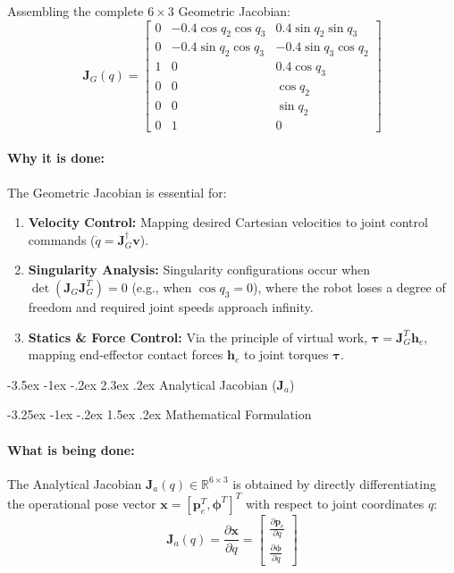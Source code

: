 \documentclass[11pt, a4paper]{article}
\makeatletter
\renewcommand{\section}{\@startsection{section}{1}{\z@}%
    {-3.5ex \@plus -1ex \@minus -.2ex}%
    {2.3ex \@plus .2ex}%
    {\normalfont\Large\bfseries\color{brandblue}}}
\renewcommand{\subsection}{\@startsection{subsection}{2}{\z@}%
    {-3.25ex \@plus -1ex \@minus -.2ex}%
    {1.5ex \@plus .2ex}%
    {\normalfont\large\bfseries\color{brandaccent}}}
\makeatother
\begin{document}
Assembling the complete $6 \times 3$ Geometric Jacobian:
\begin{equation}
\mathbf{J}_G(q) = \begin{bmatrix}
0 & -0.4 \cos q_2 \cos q_3 & 0.4 \sin q_2 \sin q_3 \\
0 & -0.4 \sin q_2 \cos q_3 & -0.4 \sin q_3 \cos q_2 \\
1 & 0 & 0.4 \cos q_3 \\
0 & 0 & \cos q_2 \\
0 & 0 & \sin q_2 \\
0 & 1 & 0
\end{bmatrix}
\end{equation}

\paragraph{Why it is done:}
The Geometric Jacobian is essential for:
\begin{enumerate}[leftmargin=1.5em]
    \item \textbf{Velocity Control:} Mapping desired Cartesian velocities to joint control commands ($\dot{q} = \mathbf{J}_G^\dagger \mathbf{v}$).
    \item \textbf{Singularity Analysis:} Singularity configurations occur when $\det(\mathbf{J}_G \mathbf{J}_G^T) = 0$ (e.g., when $\cos q_3 = 0$), where the robot loses a degree of freedom and required joint speeds approach infinity.
    \item \textbf{Statics \& Force Control:} Via the principle of virtual work, $\boldsymbol{\tau} = \mathbf{J}_G^T \mathbf{h}_e$, mapping end-effector contact forces $\mathbf{h}_e$ to joint torques $\boldsymbol{\tau}$.
\end{enumerate}

\section{\texorpdfstring{Analytical Jacobian ($\mathbf{J}_a$)}{Analytical Jacobian (Ja)}}

\subsection{Mathematical Formulation}
\paragraph{What is being done:}
The Analytical Jacobian $\mathbf{J}_a(q) \in \mathbb{R}^{6 \times 3}$ is obtained by directly differentiating the operational pose vector $\mathbf{x} = [\mathbf{p}_e^T, \boldsymbol{\phi}^T]^T$ with respect to joint coordinates $q$:
\begin{equation}
    \mathbf{J}_a(q) = \frac{\partial \mathbf{x}}{\partial q} = \begin{bmatrix} \frac{\partial \mathbf{p}_e}{\partial q} \\[0.4em] \frac{\partial \boldsymbol{\phi}}{\partial q} \end{bmatrix}
\end{equation}
\end{document}
